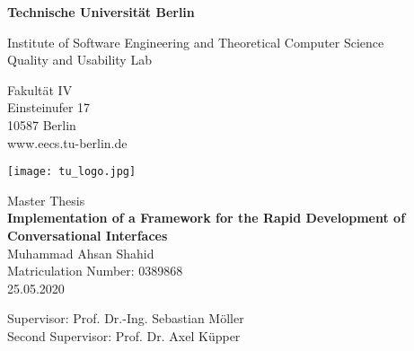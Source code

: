 \thispagestyle{empty}
\begin{center}

\vspace*{1cm}
{\LARGE \textbf{Technische Universität Berlin}}

\vspace{0.5cm}

{\large Institute of Software Engineering and Theoretical Computer Science\\[1mm]}
{\large Quality and Usability Lab\\[5mm]}

Fakultät IV\\
Einsteinufer 17\\
10587 Berlin\\
www.eecs.tu-berlin.de\\

\vspace*{0.8cm}

\texttt{[image: tu\_logo.jpg]}

\vspace*{0.8cm}

{\LARGE Master Thesis}\\

\vspace{0.8cm}
{\LARGE \textbf{Implementation of a Framework for the Rapid Development of Conversational Interfaces}}\\
\vspace*{1.0cm}
{\LARGE Muhammad Ahsan Shahid}
\\
\vspace*{0.5cm}
Matriculation Number: 0389868\\
25.05.2020\\  %
\vspace*{0.8cm}

Supervisor: Prof. Dr.-Ing. Sebastian Möller\\
\vspace*{0.4cm}
Second Supervisor: Prof. Dr. Axel Küpper
\vspace*{0.4cm}



\end{center}
